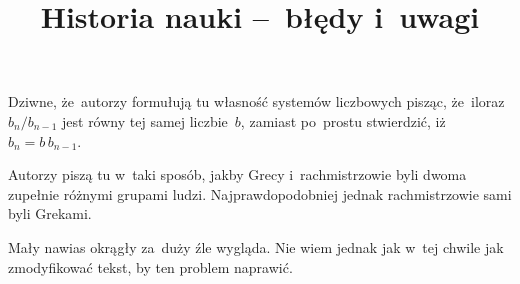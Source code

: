 \documentclass[a4paper,11pt]{article}
\title{Historia nauki --~błędy i~uwagi}
\begin{document}



\maketitle %







\start {} Dziwne, że~autorzy formułują tu własność systemów
liczbowych pisząc, że~iloraz $b_{ n } / b_{ n - 1 }$ jest równy tej
samej liczbie~$b$, zamiast po~prostu stwierdzić,
iż~$b_{ n } = b \, b_{ n - 1 }$.

\vspace{\spaceFour}



\start {} Autorzy piszą tu w~taki sposób, jakby Grecy
i~rachmistrzowie byli dwoma zupełnie różnymi grupami ludzi.
Najprawdopodobniej jednak rachmistrzowie sami byli Grekami.

\vspace{\spaceFour}



\start {} Mały nawias okrągły za~duży źle wygląda. Nie
wiem jednak jak w~tej chwile jak zmodyfikować tekst, by ten problem
naprawić.





\end{document}
